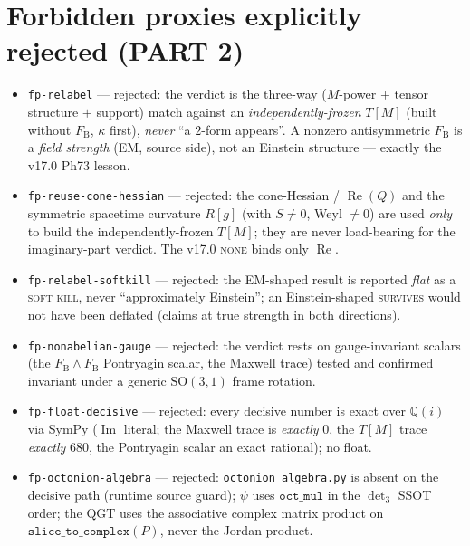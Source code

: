 \documentclass[11pt]{article}
\renewcommand{\Re}{\operatorname{Re}}
\renewcommand{\Im}{\operatorname{Im}}
\newcommand{\SO}{\mathrm{SO}}
\newcommand{\FB}{F_{\mathrm{B}}}
\theoremstyle{plain}
\theoremstyle{definition}
\begin{document}
\section{Forbidden proxies explicitly rejected (PART 2)}
\label{sec:fp2}

\begin{itemize}
\item \texttt{fp-relabel} --- rejected: the verdict is the three-way ($M$-power $+$
  tensor structure $+$ support) match against an \emph{independently-frozen} $T[M]$
  (built without $\FB$, $\kappa$ first), \emph{never} ``a $2$-form appears''. A nonzero
  antisymmetric $\FB$ is a \emph{field strength} (EM, source side), not an Einstein
  structure --- exactly the v17.0 Ph73 lesson.
\item \texttt{fp-reuse-cone-hessian} --- rejected: the cone-Hessian / $\Re(Q)$ and the
  symmetric spacetime curvature $R[g]$ (with $S\neq0$, Weyl $\neq0$) are used \emph{only}
  to build the independently-frozen $T[M]$; they are never load-bearing for the
  imaginary-part verdict. The v17.0 \textsc{none} binds only $\Re$.
\item \texttt{fp-relabel-softkill} --- rejected: the EM-shaped result is reported
  \emph{flat} as a \textsc{soft kill}, never ``approximately Einstein''; an
  Einstein-shaped \textsc{survives} would not have been deflated (claims at true strength
  in both directions).
\item \texttt{fp-nonabelian-gauge} --- rejected: the verdict rests on gauge-invariant
  scalars (the $\FB\wedge\FB$ Pontryagin scalar, the Maxwell trace) tested and confirmed
  invariant under a generic $\SO(3,1)$ frame rotation.
\item \texttt{fp-float-decisive} --- rejected: every decisive number is exact over
  $\mathbb{Q}(i)$ via SymPy ($\Im$ literal; the Maxwell trace is \emph{exactly} $0$, the
  $T[M]$ trace \emph{exactly} $680$, the Pontryagin scalar an exact rational); no float.
\item \texttt{fp-octonion-algebra} --- rejected: \texttt{octonion\_algebra.py} is absent
  on the decisive path (runtime source guard); $\psi$ uses $\mathtt{oct\_mul}$ in the
  $\det_3$ SSOT order; the QGT uses the associative complex matrix product on
  $\mathtt{slice\_to\_complex}(P)$, never the Jordan product.
\end{itemize}
\end{document}
